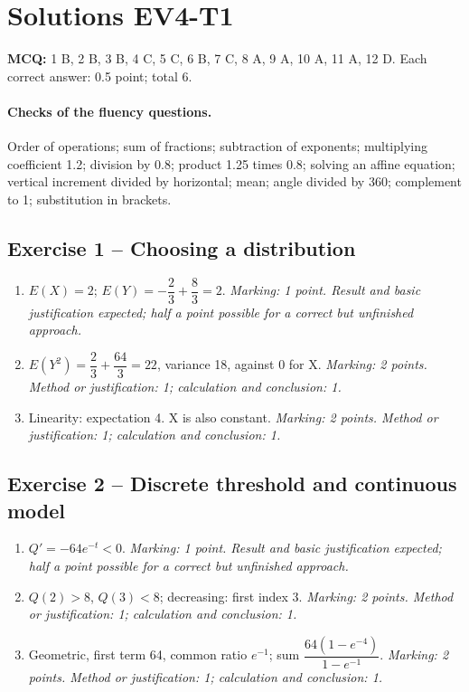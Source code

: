 \clearpage\section*{Solutions EV4-T1}\label{EV4-T1-CORR}
\textbf{MCQ:} 1 B, 2 B, 3 B, 4 C, 5 C, 6 B, 7 C, 8 A, 9 A, 10 A, 11 A, 12 D. Each correct answer: 0.5 point; total 6.
\paragraph{Checks of the fluency questions.} Order of operations; sum of fractions; subtraction of exponents; multiplying coefficient 1.2; division by 0.8; product 1.25 times 0.8; solving an affine equation; vertical increment divided by horizontal; mean; angle divided by 360; complement to 1; substitution in brackets.
\subsection*{Exercise 1 -- Choosing a distribution}
\begin{enumerate}
\item $E(X)=2$; $E(Y)=-\dfrac{2}{3}+\dfrac{8}{3}=2$. \textit{Marking: 1 point. Result and basic justification expected; half a point possible for a correct but unfinished approach.}
\item $E(Y^2)=\dfrac{2}{3}+\dfrac{64}{3}=22$, variance 18, against 0 for X. \textit{Marking: 2 points. Method or justification: 1; calculation and conclusion: 1.}
\item Linearity: expectation 4. X is also constant. \textit{Marking: 2 points. Method or justification: 1; calculation and conclusion: 1.}
\end{enumerate}
\subsection*{Exercise 2 -- Discrete threshold and continuous model}
\begin{enumerate}
\item $Q\prime=-64e^{-t}<0$. \textit{Marking: 1 point. Result and basic justification expected; half a point possible for a correct but unfinished approach.}
\item $Q(2)>8$, $Q(3)<8$; decreasing: first index 3. \textit{Marking: 2 points. Method or justification: 1; calculation and conclusion: 1.}
\item Geometric, first term 64, common ratio $e^{-1}$; sum $\dfrac{64(1-e^{-4})}{1-e^{-1}}$. \textit{Marking: 2 points. Method or justification: 1; calculation and conclusion: 1.}
\end{enumerate}
